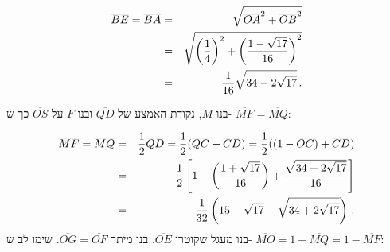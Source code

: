 \begin{eqnarray*}
\overline{BE}=\overline{BA}&=&\sqrt{\overline{OA}^2+\overline{OB}^2}\\
&=&\sqrt{\left(\displaystyle\frac{1}{4}\right)^2+\left(\displaystyle\frac{1-\sqrt{17}}{16}\right)^2}\\
&=&\displaystyle\frac{1}{16}\sqrt{34-2\sqrt{17}}\,.
\end{eqnarray*}


בנו
$M$,
נקודת האמצע של
$\overline{QD}$
ובנו
$F$
על
$\overline{OS}$
כך ש-%
$\overline{MF}=\overline{MQ}$:

\begin{eqnarray*}
\overline{MF}=\overline{MQ}&=&\displaystyle\frac{1}{2}\overline{QD}=\displaystyle\frac{1}{2}(\overline{QC}+\overline{CD})=\displaystyle\frac{1}{2}((1-\overline{OC})+\overline{CD})\\
&=&\displaystyle\frac{1}{2}\left[1-\left(\displaystyle\frac{1+\sqrt{17}}{16}\right)+\displaystyle\frac{\sqrt{34+2\sqrt{17}}}{16}\right]\\
&=&\displaystyle\frac{1}{32}\left(15-\sqrt{17}+\sqrt{34+2\sqrt{17}}\right)\,.
\end{eqnarray*}
בנו מעגל שקוטרו 
$\overline{OE}$.
בנו מיתר
$\overline{OG}=\overline{OF}$.
שימו לב ש-%
$\overline{MO}=1-\overline{MQ}=1-\overline{MF}$:



